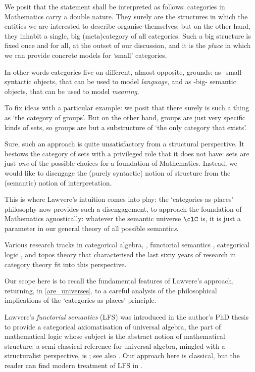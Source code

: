We posit that the statement shall be interpreted as follows: categories in Mathematics carry a double nature. They surely are the structures in which the entities we are interested to describe organise themselves; but on the other hand, they inhabit a single, big (meta)category of all categories. Such a big structure is fixed once and for all, at the outset of our discussion, and it is the \emph{place} in which we can provide concrete models for `small' categories.

In other words categories live on different, almost opposite, grounds: as -small- syntactic objects, that can be used to model \emph{language}, and as -big- semantic objects, that can be used to model \emph{meaning}.

To fix ideas with a particular example: we posit that there surely is such a thing as `the category of groups'. But on the other hand, groups are just very specific kinds of sets, so groups are but a substructure of `the only category that exists'.

Sure, such an approach is quite unsatisfactory from a structural perspective. It bestows the category of sets with a privileged role that it does not have: sets are just \emph{one} of the possible choices for a foundation of Mathematics. Instead, we would like to disengage the (purely syntactic) notion of structure from the (semantic) notion of interpretation.

This is where Lawvere's intuition comes into play: the `categories as places' philosophy now provides such a disengagement, to approach the foundation of Mathematics agnostically: whatever the semantic universe $\clC$ is, it is just a parameter in our general theory of all possible semantic\emph{s}.

Various research tracks in categorical algebra, \cite{Janelidze2004}, functorial semantics \cite{lawvere1963functorial,hyland2007category}, categorical logic \cite{lambek1988introduction}, and topos theory \cite{JohnstonePT} that characterised the last sixty years of research in category theory fit into this perspective.

Our scope here is to recall the fundamental features of Lawvere's approach, returning, in \autoref{are_universes}, to a careful analysis of the philosophical implications of the `categories as places' principle.

Lawvere's \emph{functorial semantics} (LFS) was introduced in the author's PhD thesis \cite{lawvere1963functorial} to provide a categorical axiomatisation of universal algebra, the part of mathematical logic whose subject is the abstract notion of mathematical structure: a semi-classical reference for universal algebra, mingled with a structuralist perspective, is \cite{manes2012algebraic}; see also \cite{sankappanavar}. Our approach here is classical, but the reader can find modern treatment of LFS in \cite{hyland2007category,curiennone}.%

